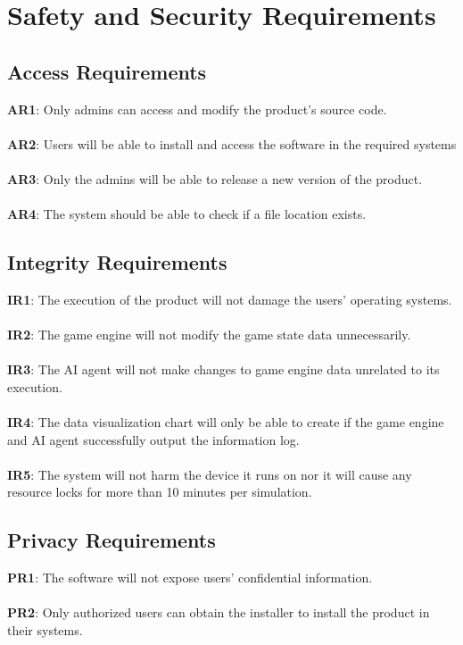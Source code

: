 \documentclass{article}
\begin{document}
\section{Safety and Security Requirements}
\subsection{Access Requirements}

\textbf{AR1}: Only admins can access and modify the product's source code. \\\\
\textbf{AR2}: Users will be able to install and access the software in the required systems\\\\
\textbf{AR3}: Only the admins will be able to release a new version of the product.\\\\ 
\textbf{AR4}: The system should be able to check if a file location exists.

\subsection{Integrity Requirements}

\textbf{IR1}: The execution of the product will not damage the users' operating systems.\\\\
\textbf{IR2}: The game engine will not modify the game state data unnecessarily. \\\\
\textbf{IR3}: The AI agent will not make changes to game engine data unrelated to its execution.  \\\\
\textbf{IR4}: The data visualization chart will only be able to create if the game engine and AI agent successfully output the information log.\\\\
\textbf{IR5}: The system will not harm the device it runs on nor it will cause any resource locks for more than 10 minutes per simulation.

\subsection{Privacy Requirements}

\textbf{PR1}: The software will not expose users' confidential information.\\\\
\textbf{PR2}: Only authorized users can obtain the installer to install the product in their systems.
\end{document}
